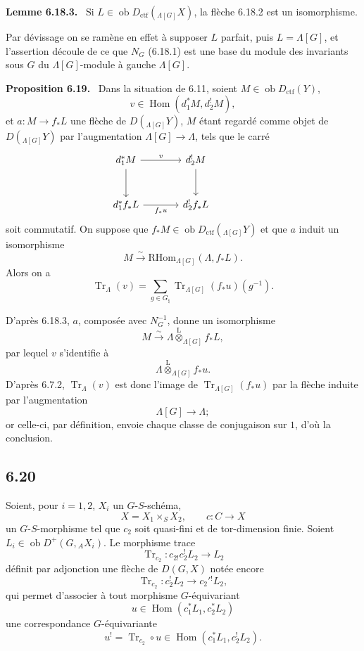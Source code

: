 \documentclass[11pt]{article}
\newenvironment{statement}[1]{\par\medskip\noindent\textbf{#1.}\ }{\par\medskip}
\DeclareMathOperator{\Hom}{Hom}
\providecommand{\RHom}{\mathrm{RHom}}
\providecommand{\Tr}{\operatorname{Tr}}
\providecommand{\Tr}{\operatorname{Tr}}
\providecommand{\lten}{\overset{\mathrm L}{\otimes}}
\providecommand{\Ob}{\operatorname{ob}}
\providecommand{\Tr}{\operatorname{Tr}}
\providecommand{\RHom}{\mathrm{RHom}}
\providecommand{\Hom}{\operatorname{Hom}}
\providecommand{\lten}{\overset{\mathrm L}{\otimes}}
\providecommand{\RHom}{\mathrm R\mathcal{H}om}
\providecommand{\lten}{\overset{\mathrm L}{\otimes}}
\providecommand{\Ob}{\operatorname{ob}}
\providecommand{\Tr}{\operatorname{Tr}}
\providecommand{\lten}{\overset{\mathrm L}{\otimes}}
\providecommand{\lten}{\overset{\mathrm L}{\otimes}}
\providecommand{\Ob}{\operatorname{Ob}}
\providecommand{\lten}{\overset{\mathrm L}{\otimes}}
\providecommand{\RHom}{\mathrm{RHom}}
\providecommand{\Hom}{\operatorname{Hom}}
\providecommand{\Tr}{\operatorname{Tr}}
\providecommand{\Ob}{\operatorname{ob}}
\providecommand{\Ob}{\operatorname{Ob}}
\providecommand{\lten}{\overset{\mathrm L}{\otimes}}
\begin{document}
\begin{statement}{Lemme 6.18.3}
Si $L\in\Ob D_{\mathrm{ctf}}({}_{\Lambda[G]}X)$, la flèche 6.18.2 est un isomorphisme.
\end{statement}

Par dévissage on se ramène en effet à supposer $L$ parfait, puis $L=\Lambda[G]$, et l'assertion découle de ce que $N_G$ (6.18.1) est une base du module des invariants sous $G$ du $\Lambda[G]$-module à gauche $\Lambda[G]$.

\begin{statement}{Proposition 6.19}
Dans la situation de 6.11, soient $M\in\Ob D_{\mathrm{ctf}}(Y)$,
\[
v\in\Hom(d_1^*M,d_2^!M),
\]
et $a:M\to f_*L$ une flèche de $D({}_{\Lambda[G]}Y)$, $M$ étant regardé comme objet de $D({}_{\Lambda[G]}Y)$ par l'augmentation $\Lambda[G]\to\Lambda$, tels que le carré
\[
\begin{tikzcd}[column sep=large,row sep=large]
d_1^*M \arrow[r,"v"] \arrow[d] & d_2^!M \arrow[d] & {}\\
d_1^*f_*L \arrow[r,"f_*u"'] & d_2^!f_*L
\end{tikzcd}
\]
soit commutatif. On suppose que $f_*M\in\Ob D_{\mathrm{ctf}}({}_{\Lambda[G]}Y)$ et que $a$ induit un isomorphisme
\[
M\xrightarrow{\sim}\RHom_{\Lambda[G]}(\Lambda,f_*L).
\]
Alors on a
\begin{equation}
\Tr_{\Lambda}(v)=
\sum_{g\in G_{\natural}}\Tr_{\Lambda[G]}(f_*u)(g^{-1}).
\tag{6.19.1}
\end{equation}
\end{statement}

D'après 6.18.3, $a$, composée avec $N_G^{-1}$, donne un isomorphisme
\[
M\xrightarrow{\sim}\Lambda\lten_{\Lambda[G]}f_*L,
\]
par lequel $v$ s'identifie à
\[
\Lambda\lten_{\Lambda[G]}f_*u.
\]
D'après 6.7.2, $\Tr_{\Lambda}(v)$ est donc l'image de $\Tr_{\Lambda[G]}(f_*u)$ par la flèche induite par l'augmentation
\[
\Lambda[G]\longrightarrow \Lambda;
\]
or celle-ci, par définition, envoie chaque classe de conjugaison sur $1$, d'où la conclusion.

\subsection*{6.20}
Soient, pour $i=1,2$, $X_i$ un $G$-$S$-schéma,
\[
X=X_1\times_SX_2,\qquad c:C\to X
\]
un $G$-$S$-morphisme tel que $c_2$ soit quasi-fini et de tor-dimension finie. Soient $L_i\in\Ob D^+(G,{}_AX_i)$. Le morphisme trace
\[
\Tr_{c_2}:c_{2!}c_2^!L_2\longrightarrow L_2
\]
définit par adjonction une flèche de $D(G,X)$ notée encore
\begin{equation}
\Tr_{c_2}:c_2^!L_2\longrightarrow c_2'{}^!L_2,
\tag{6.20.1}
\end{equation}
qui permet d'associer à tout morphisme $G$-équivariant
\[
u\in\Hom(c_1^*L_1,c_2^*L_2)
\]
une correspondance $G$-équivariante
\begin{equation}
u^! = \Tr_{c_2}\circ u\in\Hom(c_1^*L_1,c_2^!L_2).
\tag{6.20.2}
\end{equation}
\end{document}
